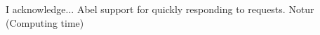 \begin{acknowledgements}
I acknowledge...
Abel support for quickly responding to requests. Notur (Computing time)
\end{acknowledgements}